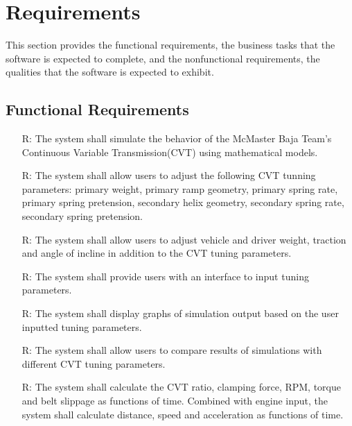 \documentclass[12pt]{article}
\newcounter{reqnum} %
\begin{document}
\section{Requirements}

This section provides the functional requirements, the business tasks that the
software is expected to complete, and the nonfunctional requirements, the
qualities that the software is expected to exhibit.

\subsection{Functional Requirements}

\noindent \begin{itemize}

\item[R\refstepcounter{reqnum}\thereqnum \label{R_Inputs}:] The system shall simulate the behavior of the McMaster Baja Team's Continuous Variable Transmission(CVT) using mathematical models.

\item[R\refstepcounter{reqnum}\thereqnum \label{R_Inputs}:] The system shall allow users to adjust the following CVT tunning parameters: primary weight, primary ramp geometry, primary spring rate, primary spring pretension, secondary helix geometry, secondary spring rate, secondary spring pretension. 

\item[R\refstepcounter{reqnum}\thereqnum \label{R_Inputs}:] The system shall allow users to adjust vehicle and driver weight, traction and angle of incline in addition to the CVT tuning parameters.

\item[R\refstepcounter{reqnum}\thereqnum \label{R_Inputs}:] The system shall provide users with an interface to input tuning parameters.

\item[R\refstepcounter{reqnum}\thereqnum \label{R_Inputs}:] The system shall display graphs of simulation output based on the user inputted tuning parameters.

\item[R\refstepcounter{reqnum}\thereqnum \label{R_Inputs}:] The system shall allow users to compare results of simulations with different CVT tuning parameters.

\item[R\refstepcounter{reqnum}\thereqnum \label{R_Inputs}:] The system shall calculate the CVT ratio, clamping force, RPM, torque and belt slippage as functions of time. Combined with engine input, the system shall calculate distance, speed and acceleration as functions of time.


\end{itemize}
\end{document}
